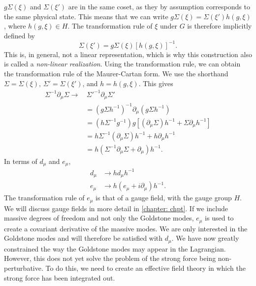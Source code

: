 $g\Sigma(\xi)$ and $\Sigma(\xi')$ are in the same coset, as they by assumption corresponds to the same physical state.
This means that we can write $g\Sigma(\xi) = \Sigma(\xi') h(g, \xi)$, where $h(g, \xi) \in H$.
The transformation rule of $\xi$ under $G$ is therefore implicitly defined by
%
\begin{equation}
    \Sigma(\xi') = g \Sigma(\xi) [h(g, \xi)]^{-1}.
\end{equation}
%
This is, in general, not a linear representation, which is why this construction also is called a \emph{non-linear realization}.
Using the transformation rule, we can obtain the transformation rule of the Maurer-Cartan form.
We use the shorthand $\Sigma = \Sigma(\xi),\, \Sigma' = \Sigma(\xi')$, and $h = h(g, \xi)$.
This gives
%
\begin{align*}
    \Sigma^{-1} \partial_\mu \Sigma
    \rightarrow 
    & \, \Sigma'^{-1} \partial_\mu \Sigma' \\
    & = (g \Sigma h^{-1})^{-1} \partial_\mu (g \Sigma h^{-1}) \\
    & = (h \Sigma^{-1} g^{-1}) g [(\partial_\mu \Sigma)h^{-1} + \Sigma \partial_\mu h^{-1}] \\
    & = h \Sigma^{-1} (\partial_\mu \Sigma) h^{-1}
    + h \partial_\mu h^{-1} \\
    & = h (\Sigma^{-1} \partial_\mu \Sigma + \partial_\mu) h^{-1}.
\end{align*}
%
In terms of $d_\mu$ and $e_\mu$,
%
\begin{align}
    d_\mu & \rightarrow h d_\mu h^{-1} \\
    e_\mu & \rightarrow h (e_\mu + i\partial_\mu )h^{-1}.
\end{align}
%
The transformation rule of $e_\mu$ is that of a gauge field, with the gauge group $H$.
We will discuss gauge fields in more detail in \autoref{chapter: chpt}.
If we include massive degrees of freedom and not only the Goldstone modes, $e_\mu$ is used to create a covariant derivative of the massive modes.
We are only interested in the Goldstone modes and will therefore be satisfied with $d_\mu$.
We have now greatly constrained the way the Goldstone modes may appear in the Lagrangian.
However, this does not yet solve the problem of the strong force being non-perturbative.
To do this, we need to create an effective field theory in which the strong force has been integrated out.



